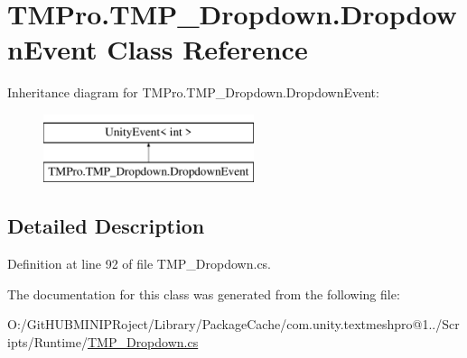 \hypertarget{class_t_m_pro_1_1_t_m_p___dropdown_1_1_dropdown_event}{}\section{T\+M\+Pro.\+T\+M\+P\+\_\+\+Dropdown.\+Dropdown\+Event Class Reference}
\label{class_t_m_pro_1_1_t_m_p___dropdown_1_1_dropdown_event}
Inheritance diagram for T\+M\+Pro.\+T\+M\+P\+\_\+\+Dropdown.\+Dropdown\+Event\+:\begin{figure}[H]
\begin{center}
\leavevmode
\includegraphics[height=2.000000cm]{class_t_m_pro_1_1_t_m_p___dropdown_1_1_dropdown_event}
\end{center}
\end{figure}


\subsection{Detailed Description}


Definition at line 92 of file T\+M\+P\+\_\+\+Dropdown.\+cs.



The documentation for this class was generated from the following file\+:\begin{DoxyCompactItemize}
\item 
O\+:/\+Git\+H\+U\+B\+M\+I\+N\+I\+P\+Roject/\+Library/\+Package\+Cache/com.\+unity.\+textmeshpro@1../\+Scripts/\+Runtime/\mbox{\hyperlink{_t_m_p___dropdown_8cs}{T\+M\+P\+\_\+\+Dropdown.\+cs}}\end{DoxyCompactItemize}
